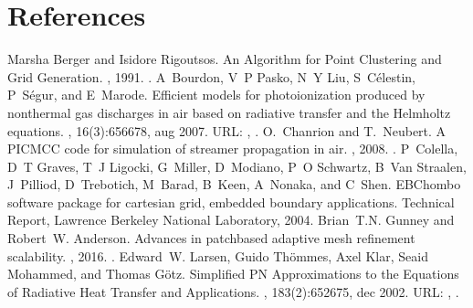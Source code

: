 \documentclass[letterpaper,10pt,english]{sphinxmanual}
\begin{document}
\section{References}
\label{\detokenize{ZZReferences:references}}\label{\detokenize{ZZReferences::doc}}
\begin{sphinxthebibliography}{1}
\sphinxAtStartPar
Marsha Berger and Isidore Rigoutsos. An Algorithm for Point Clustering and Grid Generation. , 1991. .
\sphinxAtStartPar
A Bourdon, V P Pasko, N Y Liu, S Célestin, P Ségur, and E Marode. Efficient models for photoionization produced by non\sphinxhyphen{}thermal gas discharges in air based on radiative transfer and the Helmholtz equations. , 16(3):656\textendash{}678, aug 2007. URL: , .
\sphinxAtStartPar
O. Chanrion and T. Neubert. A PIC\sphinxhyphen{}MCC code for simulation of streamer propagation in air. , 2008. .
\sphinxAtStartPar
P Colella, D T Graves, T J Ligocki, G Miller, D Modiano, P O Schwartz, B Van Straalen, J Pilliod, D Trebotich, M Barad, B Keen, A Nonaka, and C Shen. EBChombo software package for cartesian grid, embedded boundary applications. Technical Report, Lawrence Berkeley National Laboratory, 2004.
\sphinxAtStartPar
Brian T.N. Gunney and Robert W. Anderson. Advances in patch\sphinxhyphen{}based adaptive mesh refinement scalability. , 2016. .
\sphinxAtStartPar
Edward W. Larsen, Guido Thömmes, Axel Klar, Seaid Mohammed, and Thomas Götz. Simplified PN Approximations to the Equations of Radiative Heat Transfer and Applications. , 183(2):652\textendash{}675, dec 2002. URL: , .

\end{sphinxthebibliography}
\end{document}
